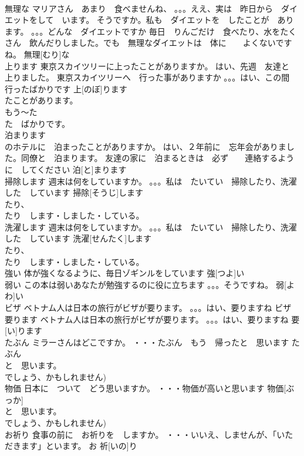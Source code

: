 \documentclass[8pt]{extreport}
\begin{document}
\begin{CJK}{UTF8}{min}
\\	無理な	マリアさん　あまり　食べませんね、 。。。ええ、実は　昨日から　ダイエットをして　います。 そうですか。私も　ダイエットを　したことが　あります。 。。。どんな　ダイエットですか 毎日　りんごだけ　食べたり、水をたくさん　飲んだりしました。でも　無理なダイエットは　体に　　よくないですね。	無理[むり]な			
\\	上ります	東京スカイツリーに上ったことがありますか。 はい、先週　友達と　上りました。 東京スカイツリーへ　行った事がありますか 。。。はい、この間　行ったばかりです	上[のぼ]ります			
\\	たことがあります。
\\	もう～た
\\	た　ばかりです。
\\	泊まります	
\\	のホテルに　泊まったことがありますか。 はい、２年前に　忘年会がありました。同僚と　泊まります。 友達の家に　泊まるときは　必ず　　連絡するように　してください	泊[と]まります			
\\	掃除します	週末は何をしていますか。 。。。私は　たいてい　掃除したり、洗濯した　しています	掃除[そうじ]します			
\\	たり、
\\	たり　します・しました・している。
\\	洗濯します	週末は何をしていますか。 。。。私は　たいてい　掃除したり、洗濯した　しています	洗濯[せんたく]します			
\\	たり、
\\	たり　します・しました・している。
\\	強い	体が強くなるように、毎日ゾギンルをしています	強[つよ]い			
\\	弱い	この本は弱いあなたが勉強するのに役に立ちます 。。。そうですね。	弱[よわ]い			
\\	ビザ	ベトナム人は日本の旅行がビザが要ります。 。。。はい、要りますね	ビザ			
\\	要ります	ベトナム人は日本の旅行がビザが要ります。 。。。はい、要りますね	要[い]ります			
\\	たぶん	ミラーさんはどこですか。 ・・・たぶん　もう　帰ったと　思います	たぶん			
\\	と　思います。
\\	でしょう、かもしれません)		
\\	物価	日本に　ついて　どう思いますか。 ・・・物価が高いと思います	物価[ぶっか]			
\\	と　思います。
\\	でしょう、かもしれません)	
\\	お祈り	食事の前に　お祈りを　しますか。 ・・・いいえ、しませんが、「いただきます」といます。	お 祈[いの]り			

\end{CJK}
\end{document}
